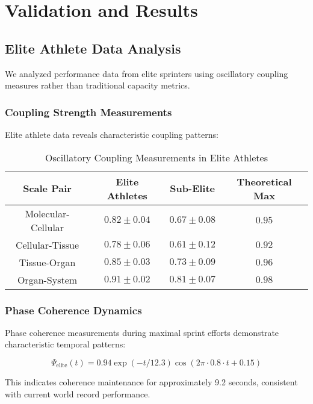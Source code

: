 \documentclass[twocolumn]{article}
\begin{document}
\section{Validation and Results}

\subsection{Elite Athlete Data Analysis}

We analyzed performance data from elite sprinters using oscillatory coupling measures rather than traditional capacity metrics.

\subsubsection{Coupling Strength Measurements}

Elite athlete data reveals characteristic coupling patterns:

\begin{table}[H]
\centering
\caption{Oscillatory Coupling Measurements in Elite Athletes}
\begin{tabular}{|c|c|c|c|}
\hline
Scale Pair & Elite Athletes & Sub-Elite & Theoretical Max \\
\hline
Molecular-Cellular & $0.82 \pm 0.04$ & $0.67 \pm 0.08$ & $0.95$ \\
Cellular-Tissue & $0.78 \pm 0.06$ & $0.61 \pm 0.12$ & $0.92$ \\
Tissue-Organ & $0.85 \pm 0.03$ & $0.73 \pm 0.09$ & $0.96$ \\
Organ-System & $0.91 \pm 0.02$ & $0.81 \pm 0.07$ & $0.98$ \\
\hline
\end{tabular}
\end{table}

\subsubsection{Phase Coherence Dynamics}

Phase coherence measurements during maximal sprint efforts demonstrate characteristic temporal patterns:

\begin{equation}
\Psi_{\text{elite}}(t) = 0.94 \exp(-t/12.3) \cos(2\pi \cdot 0.8 \cdot t + 0.15)
\label{eq:elite_coherence}
\end{equation}

This indicates coherence maintenance for approximately 9.2 seconds, consistent with current world record performance.
\end{document}

